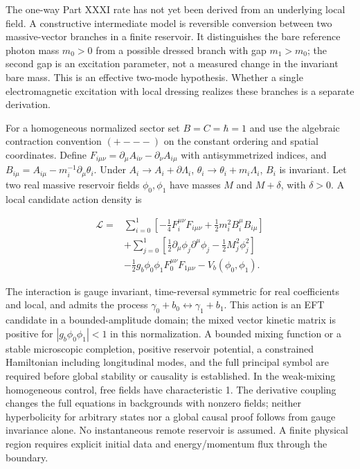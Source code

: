 \documentclass[
  11pt,
  twoside]{article}
\begin{document}
The one-way Part XXXI rate has not yet been derived from an underlying
local field. A constructive intermediate model is reversible conversion
between two massive-vector branches in a finite reservoir. It
distinguishes the bare reference photon mass \(m_0>0\) from a possible
dressed branch with gap \(m_1>m_0\); the second gap is an excitation
parameter, not a measured change in the invariant bare mass. This is an
effective two-mode hypothesis. Whether a single electromagnetic
excitation with local dressing realizes these branches is a separate
derivation.

For a homogeneous normalized sector set \(B=C=\hbar=1\) and use the
algebraic contraction convention \((+---)\) on the constant ordering and
spatial coordinates. Define
\(F_{i\mu\nu}=\partial_\mu A_{i\nu}-\partial_\nu A_{i\mu}\) with
antisymmetrized indices, and
\(B_{i\mu}=A_{i\mu}-m_i^{-1}\partial_\mu\theta_i\). Under
\(A_i\to A_i+\partial\Lambda_i\), \(\theta_i\to\theta_i+m_i\Lambda_i\),
\(B_i\) is invariant. Let two real massive reservoir fields
\(\phi_0,\phi_1\) have masses \(M\) and \(M+\delta\), with \(\delta>0\).
A local candidate action density is

\[\begin{aligned}
\mathcal L={}&\sum_{i=0}^1\left[-\tfrac14 F_i^{\mu\nu}F_{i\mu\nu}
+\tfrac12 m_i^2 B_i^\mu B_{i\mu}\right]\\
&+\sum_{j=0}^1\left[\tfrac12\partial_\mu\phi_j\partial^\mu\phi_j
-\tfrac12 M_j^2\phi_j^2\right]\\
&-\tfrac12 g_b\phi_0\phi_1 F_0^{\mu\nu}F_{1\mu\nu}-V_b(\phi_0,\phi_1).
\end{aligned}\tag{H3}\]

The interaction is gauge invariant, time-reversal symmetric for real
coefficients and local, and admits the process
\(\gamma_0+b_0\leftrightarrow\gamma_1+b_1\). This action is an EFT
candidate in a bounded-amplitude domain; the mixed vector kinetic matrix
is positive for \(|g_b\phi_0\phi_1|<1\) in this normalization. A bounded
mixing function or a stable microscopic completion, positive reservoir
potential, a constrained Hamiltonian including longitudinal modes, and
the full principal symbol are required before global stability or
causality is established. In the weak-mixing homogeneous control, free
fields have characteristic 1. The derivative coupling changes the full
equations in backgrounds with nonzero fields; neither hyperbolicity for
arbitrary states nor a global causal proof follows from gauge invariance
alone. No instantaneous remote reservoir is assumed. A finite physical
region requires explicit initial data and energy/momentum flux through
the boundary.
\end{document}
